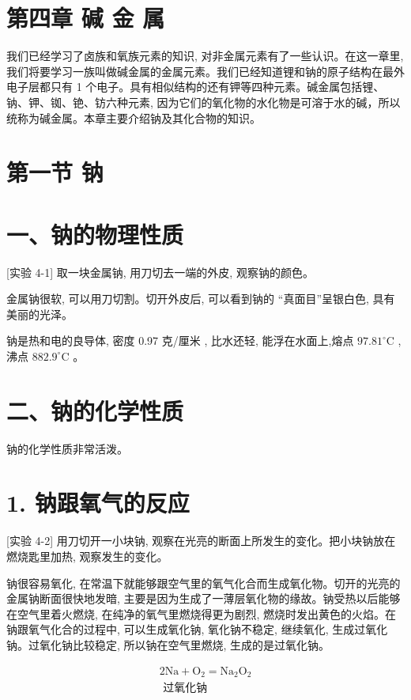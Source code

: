\documentclass[10pt]{article}
\begin{document}
\section*{第四章 碱 金 属}

我们已经学习了卤族和氧族元素的知识, 对非金属元素有了一些认识。在这一章里, 我们将要学习一族叫做碱金属的金属元素。我们已经知道锂和钠的原子结构在最外电子层都只有 1 个电子。具有相似结构的还有钾等四种元素。碱金属包括锂、钠、钾、铷、铯、钫六种元素, 因为它们的氧化物的水化物是可溶于水的碱，所以统称为碱金属。本章主要介绍钠及其化合物的知识。

\section*{第一节 钠}

\section*{一、钠的物理性质}

[实验 4-1] 取一块金属钠, 用刀切去一端的外皮, 观察钠的颜色。

金属钠很软, 可以用刀切割。切开外皮后, 可以看到钠的 “真面目”呈银白色, 具有美丽的光泽。

钠是热和电的良导体, 密度 0.97 克/厘米 , 比水还轻, 能浮在水面上,熔点 \({97.81}^{ \circ }\mathrm{C}\) ,沸点 \({882.9}^{ \circ }\mathrm{C}\) 。

\section*{二、钠的化学性质}

钠的化学性质非常活泼。

\section*{1. 钠跟氧气的反应}

[实验 4-2] 用刀切开一小块钠, 观察在光亮的断面上所发生的变化。把小块钠放在燃烧匙里加热, 观察发生的变化。

钠很容易氧化, 在常温下就能够跟空气里的氧气化合而生成氧化物。切开的光亮的金属钠断面很快地发暗, 主要是因为生成了一薄层氧化物的缘故。钠受热以后能够在空气里着火燃烧, 在纯净的氧气里燃烧得更为剧烈, 燃烧时发出黄色的火焰。在钠跟氧气化合的过程中, 可以生成氧化钠, 氧化钠不稳定, 继续氧化, 生成过氧化钠。过氧化钠比较稳定, 所以钠在空气里燃烧, 生成的是过氧化钠。

\[
\begin{array}{r} 2\mathrm{{Na}} + {\mathrm{O}}_{2} = {\mathrm{{Na}}}_{2}{\mathrm{O}}_{2} \\ \text{ 过氧化钠 } \end{array}
\]
\end{document}
